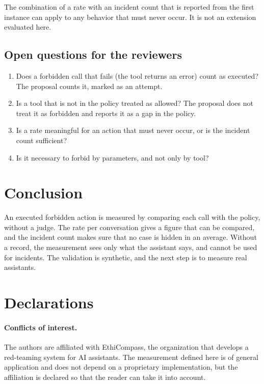 \documentclass[11pt,a4paper]{article}
\begin{document}
The combination of a rate with an incident count that is reported from the first instance can apply to any behavior
that must never occur. It is not an extension evaluated here.

\subsection{Open questions for the reviewers}

\begin{enumerate}
  \item Does a forbidden call that fails (the tool returns an error) count as executed? The proposal counts it,
    marked as an attempt.
  \item Is a tool that is not in the policy treated as allowed? The proposal does not treat it as forbidden and
    reports it as a gap in the policy.
  \item Is a rate meaningful for an action that must never occur, or is the incident count sufficient?
  \item Is it necessary to forbid by parameters, and not only by tool?
\end{enumerate}

\section{Conclusion}

An executed forbidden action is measured by comparing each call with the policy, without a judge. The rate per
conversation gives a figure that can be compared, and the incident count makes sure that no case is hidden in an
average. Without a record, the measurement sees only what the assistant says, and cannot be used for incidents. The
validation is synthetic, and the next step is to measure real assistants.

\section*{Declarations}

\paragraph{Conflicts of interest.} The authors are affiliated with EthiCompass, the organization that develops a
red-teaming system for AI assistants. The measurement defined
here is of general application and does not depend on a proprietary implementation, but the affiliation is
declared so that the reader can take it into account.
\end{document}
